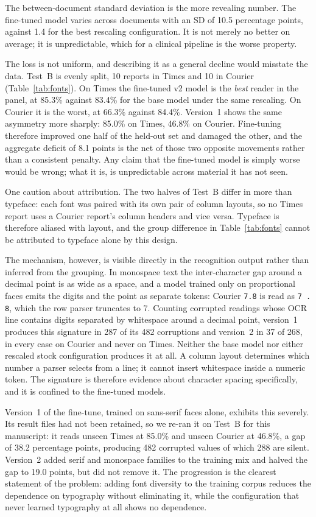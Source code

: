 \documentclass[11pt]{article}
\begin{document}
The between-document standard deviation is the more revealing number. The fine-tuned model
varies across documents with an SD of 10.5 percentage points, against 1.4 for the best rescaling
configuration. It is not merely no better on average; it is unpredictable, which for a clinical
pipeline is the worse property.

The loss is not uniform, and describing it as a general decline would misstate the data.
Test~B is evenly split, 10 reports in Times and 10 in Courier
(Table~\ref{tab:fonts}). On Times the fine-tuned v2 model is the \emph{best} reader in the
panel, at 85.3\% against 83.4\% for the base model under the same rescaling. On Courier it is
the worst, at 66.3\% against 84.4\%. Version~1 shows the same asymmetry more sharply: 85.0\% on
Times, 46.8\% on Courier. Fine-tuning therefore improved one half of the held-out set and
damaged the other, and the aggregate deficit of 8.1 points is the net of those two opposite
movements rather than a consistent penalty. Any claim that the fine-tuned model is simply worse
would be wrong; what it is, is unpredictable across material it has not seen.

One caution about attribution. The two halves of Test~B differ in more than typeface: each
font was paired with its own pair of column layouts, so no Times report uses a Courier report's
column headers and vice versa. Typeface is therefore aliased with layout, and the group
difference in Table~\ref{tab:fonts} cannot be attributed to typeface alone by this design.

The mechanism, however, is visible directly in the recognition output rather than inferred from
the grouping. In monospace text the inter-character gap around a decimal point is as wide as a
space, and a model trained only on proportional faces emits the digits and the point as separate
tokens: Courier \texttt{7.8} is read as \texttt{7 . 8}, which the row parser truncates to 7.
Counting corrupted readings whose OCR line contains digits separated by whitespace around a
decimal point, version~1 produces this signature in 287 of its 482 corruptions and version~2 in
37 of 268, in every case on Courier and never on Times. Neither the base model nor either
rescaled stock configuration produces it at all. A column layout determines which number a
parser selects from a line; it cannot insert whitespace inside a numeric token. The signature
is therefore evidence about character spacing specifically, and it is confined to the fine-tuned
models.

Version~1 of the fine-tune, trained on sans-serif faces alone, exhibits this severely. Its
result files had not been retained, so we re-ran it on Test~B for this manuscript: it reads
unseen Times at 85.0\% and unseen Courier at 46.8\%, a gap of 38.2 percentage points, producing
482 corrupted values of which 288 are silent. Version~2 added serif and monospace families to
the training mix and halved the gap to 19.0 points, but did not remove it. The progression is
the clearest statement of the problem: adding font diversity to the training corpus reduces the
dependence on typography without eliminating it, while the configuration that never learned
typography at all shows no dependence.
\end{document}
